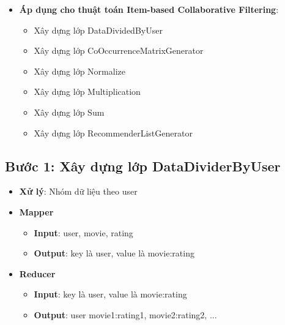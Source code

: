 \begin{itemize}
\begin{itemize}
          \end{itemize}
    \item \textbf{Áp dụng cho thuật toán Item-based Collaborative Filtering}:
          \begin{itemize}
              \item Xây dựng lớp DataDividedByUser
              \item Xây dựng lớp CoOccurrenceMatrixGenerator
              \item Xây dựng lớp Normalize
              \item Xây dựng lớp Multiplication
              \item Xây dựng lớp Sum
              \item Xây dựng lớp RecommenderListGenerator
          \end{itemize}
\end{itemize}

\subsection*{Bước 1: Xây dựng lớp DataDividerByUser}
\begin{itemize}
    \item \textbf{Xử lý}: Nhóm dữ liệu theo user \\
    \item \textbf{Mapper}
          \begin{itemize}
              \item \textbf{Input}: user, movie, rating \\
              \item \textbf{Output}: key là user, value là movie:rating \\
          \end{itemize}
    \item \textbf{Reducer}
          \begin{itemize}
              \item \textbf{Input}: key là user, value là movie:rating \\
              \item \textbf{Output}: user \quad movie1:rating1, movie2:rating2, ... \\
          \end{itemize}
\end{itemize}
